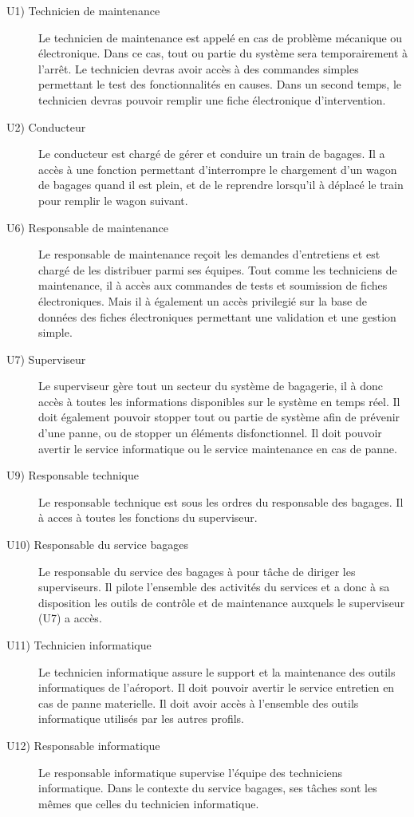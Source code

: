 \begin{description}
\item[U1) Technicien de maintenance] Le technicien de maintenance est appelé en
cas de problème mécanique ou électronique. Dans ce cas, tout ou partie du
système sera temporairement à l'arrêt. Le technicien devras avoir accès à des
commandes simples permettant le test des fonctionnalités en causes. Dans un
second temps, le technicien devras pouvoir remplir une fiche électronique
d'intervention.
\item[U2) Conducteur] Le conducteur est chargé de gérer et conduire un train de
bagages. Il a accès à une fonction permettant d'interrompre le chargement d'un
wagon de bagages quand il est plein, et de le reprendre lorsqu'il à déplacé le
train pour remplir le wagon suivant.
\item[U6) Responsable de maintenance] Le responsable de maintenance reçoit les
demandes d'entretiens et est chargé de les distribuer parmi ses équipes. Tout
comme les techniciens de maintenance, il à accès aux commandes de tests et
soumission de fiches électroniques. Mais il à également un accès privilegié sur
la base de données des fiches électroniques permettant une validation et une
gestion simple.
\item[U7) Superviseur] Le superviseur gère tout un secteur du système de
bagagerie, il à donc accès à toutes les informations disponibles sur le système
en temps réel. Il doit également pouvoir stopper tout ou partie de système afin
de prévenir d'une panne, ou de stopper un éléments disfonctionnel. Il doit
pouvoir avertir le service informatique ou le service maintenance en cas de panne.
\item[U9) Responsable technique] Le responsable technique est sous les ordres du
responsable des bagages. Il à acces à toutes les fonctions du superviseur.
\item[U10) Responsable du service bagages] Le responsable du service des bagages
à pour tâche de diriger les superviseurs. Il pilote l'ensemble des activités du
services et a donc à sa disposition les outils de contrôle et de maintenance
auxquels le superviseur (U7) a accès.
\item[U11) Technicien informatique] Le technicien informatique assure le
support et la maintenance des outils informatiques de l'aéroport. Il doit
pouvoir avertir le service entretien en cas de panne materielle. Il doit avoir
accès à l'ensemble des outils informatique utilisés par les autres profils.
\item[U12) Responsable informatique] Le responsable informatique supervise
l'équipe des techniciens informatique. Dans le contexte du service bagages, ses
tâches sont les mêmes que celles du technicien informatique.
\end{description}